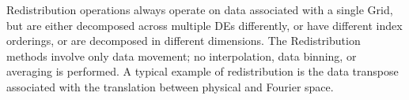 

Redistribution operations always operate on data associated with a
single Grid, but are either decomposed across multiple DEs
differently, or have different index orderings, or are decomposed
in different dimensions.  The Redistribution methods involve only
data movement; no interpolation, data binning, or averaging is
performed.  A typical example of redistribution is the data transpose
associated with the translation between physical and Fourier space.


